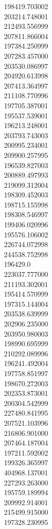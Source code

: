 198419.703002\\
203214.748001\\
212493.556999\\
207811.866004\\
197384.250999\\
207283.457000\\
203530.086997\\
204920.613998\\
207413.364997\\
211108.770996\\
197705.387001\\
195537.539001\\
196213.248001\\
203793.743003\\
200995.234001\\
209900.257995\\
196539.827003\\
200889.497993\\
219099.312004\\
198309.452003\\
198715.155998\\
198308.546997\\
199406.020996\\
195576.106002\\
226744.072998\\
244538.752998\\
196429.0\\
223037.777000\\
211193.302001\\
195414.570999\\
197315.144004\\
203538.639999\\
202906.235000\\
203950.980003\\
198990.695999\\
210292.089996\\
196241.492004\\
197758.851997\\
198670.272003\\
202353.873001\\
200304.542999\\
227480.841995\\
207521.103996\\
216806.901000\\
207464.187004\\
197211.592002\\
199326.365997\\
404968.137001\\
227293.263000\\
195759.189994\\
209992.914001\\
215499.915000\\
197328.230995\\
